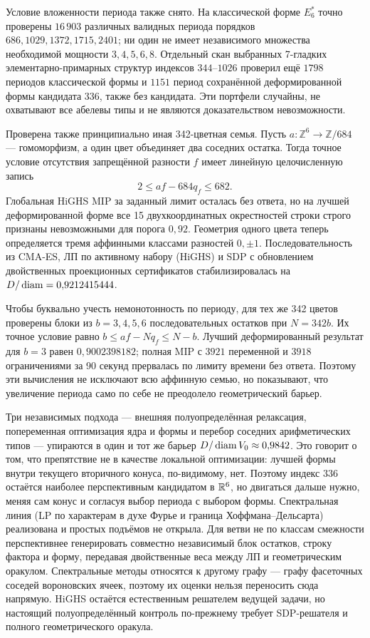 Условие вложенности периода также снято. На классической форме $E_6^*$
точно проверены $16\,903$ различных валидных периода порядков
$686,1029,1372,1715,2401$; ни один не имеет независимого множества
необходимой мощности $3,4,5,6,8$. Отдельный скан выбранных 7-гладких
элементарно-примарных структур индексов $344$--$1026$ проверил ещё $1798$ периодов
классической формы и $1151$ период сохранённой деформированной формы кандидата
336, также без кандидата. Эти портфели случайны, не охватывают все абелевы
типы и не являются доказательством невозможности.

Проверена также принципиально иная 342-цветная семья. Пусть
$a:\mathbb Z^6\to\mathbb Z/684$ --- гомоморфизм, а один цвет объединяет два
соседних остатка. Тогда точное условие отсутствия запрещённой разности $f$ имеет
линейную целочисленную запись
\[
  2\le af-684q_f\le682.
\]
Глобальная HiGHS MIP за заданный лимит осталась без ответа, но на
лучшей деформированной форме все 15 двухкоординатных окрестностей строки
строго признаны невозможными для порога $0{,}92$. Геометрия одного цвета
теперь определяется тремя аффинными классами разностей $0,\pm1$.
Последовательность из CMA-ES, ЛП по активному набору (HiGHS) и SDP с обновлением
двойственных проекционных сертификатов стабилизировалась на
$D/\operatorname{diam}=0{,}9212415444$.

Чтобы буквально учесть немонотонность по периоду, для тех же 342 цветов
проверены блоки из $b=3,4,5,6$ последовательных остатков при
$N=342b$. Их точное условие равно
$b\le af-Nq_f\le N-b$. Лучший деформированный результат для $b=3$ равен
$0{,}9002398182$; полная MIP с $3921$ переменной и $3918$ ограничениями за
90 секунд прервалась по лимиту времени без ответа. Поэтому эти вычисления не
исключают всю аффинную семью, но показывают, что увеличение периода само по
себе не преодолело геометрический барьер.

Три независимых подхода --- внешняя полуопределённая релаксация, попеременная
оптимизация ядра и формы и перебор соседних арифметических типов --- упираются в
один и тот же барьер $D/\operatorname{diam} V_0\approx0{,}9842$. Это говорит о том, что
препятствие не в качестве локальной оптимизации: лучшей формы внутри текущего
вторичного конуса, по-видимому, нет. Поэтому индекс $336$ остаётся наиболее
перспективным кандидатом в $\mathbb{R}^6$, но двигаться дальше нужно, меняя сам конус и
согласуя выбор периода с выбором формы. Спектральная линия (LP по характерам в
духе Фурье и граница Хоффмана--Дельсарта) реализована и простых подъёмов не
открыла. Для ветви не по классам смежности перспективнее генерировать совместно
независимый блок остатков, строку фактора и форму, передавая двойственные веса
между ЛП и геометрическим оракулом. Спектральные методы
\cite{DSMMV} относятся к другому графу --- графу фасеточных соседей
вороновских ячеек, поэтому их оценки нельзя переносить сюда напрямую.
HiGHS остаётся естественным решателем ведущей задачи, но настоящий полуопределённый контроль
по-прежнему требует SDP-решателя и полного геометрического оракула.

